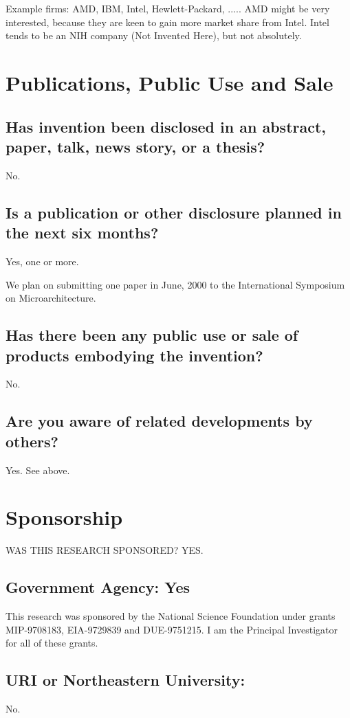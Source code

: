 \documentclass[10pt,dvips]{article}
\begin{document}
Example firms: AMD, IBM, Intel, Hewlett-Packard, ..... AMD might be very interested,
because they are keen to gain more market share from Intel. Intel tends to be
an NIH company (Not Invented Here), but not absolutely.

\newpage

\section{Publications, Public Use and Sale}
\subsection{Has invention been disclosed in an abstract, paper, talk, news story, or
a thesis?}
No.

\subsection{Is a publication or other disclosure planned in the next six months?}
Yes, one or more.

We plan on submitting one paper in June, 2000 to the International Symposium on
Microarchitecture. 

\subsection{Has there been any public use or sale of products embodying the invention?}
No.

\subsection{Are you aware of related developments by others?} Yes. See above.

\newpage

\section{Sponsorship}
WAS THIS RESEARCH SPONSORED?	YES.

\subsection{Government Agency: Yes}
This research was sponsored by the National Science Foundation under grants
MIP-9708183, EIA-9729839 and DUE-9751215. I am the Principal Investigator for
all of these grants.

\subsection{URI or Northeastern University:} No.
\end{document}
